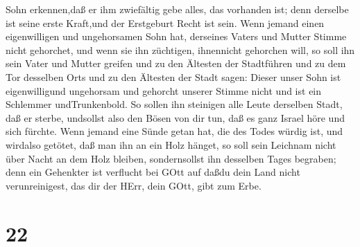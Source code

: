Sohn erkennen,daß er ihm zwiefältig gebe alles, das vorhanden ist; denn
derselbe ist seine erste Kraft,und der Erstgeburt Recht ist sein.
 Wenn jemand einen eigenwilligen und ungehorsamen Sohn hat,
derseines Vaters und Mutter Stimme nicht gehorchet, und wenn sie ihn
züchtigen, ihnennicht gehorchen will,  so soll ihn sein
Vater und Mutter greifen und zu den Ältesten der Stadtführen und zu dem
Tor desselben Orts  und zu den Ältesten der Stadt sagen:
Dieser unser Sohn ist eigenwilligund ungehorsam und gehorcht unserer
Stimme nicht und ist ein Schlemmer undTrunkenbold.  So
sollen ihn steinigen alle Leute derselben Stadt, daß er sterbe,
undsollst also den Bösen von dir tun, daß es ganz Israel höre und sich
fürchte.  Wenn jemand eine Sünde getan hat, die des Todes
würdig ist, und wirdalso getötet, daß man ihn an ein Holz hänget,
 so soll sein Leichnam nicht über Nacht an dem Holz
bleiben, sondernsollst ihn desselben Tages begraben; denn ein Gehenkter
ist verflucht bei GOtt auf daßdu dein Land nicht verunreinigest, das dir
der HErr, dein GOtt, gibt zum Erbe.

\hypertarget{section-21}{%
\section{22}\label{section-21}}

